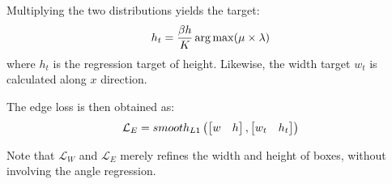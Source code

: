 Multiplying the two distributions yields the target:
\begin{equation} \setlength\abovedisplayskip{6pt} \setlength\belowdisplayskip{6pt}
h_t = \frac{\beta h}{K} \arg \max (\mu \times \lambda)
\end{equation}
where $h_t$ is the regression target of height. Likewise, the width target $w_t$ is calculated along $x$ direction.

The edge loss is then obtained as:
\begin{equation} \setlength\abovedisplayskip{6pt} \setlength\belowdisplayskip{6pt}
\mathcal{L}_E = smooth_{L1}\left ( \begin{bmatrix}
w & h
\end{bmatrix}, 
\begin{bmatrix}
w_t & h_t
\end{bmatrix}
\right )
\end{equation}

Note that $\mathcal{L}_W$ and $\mathcal{L}_E$ merely refines the width and height of boxes, without involving the angle regression.

